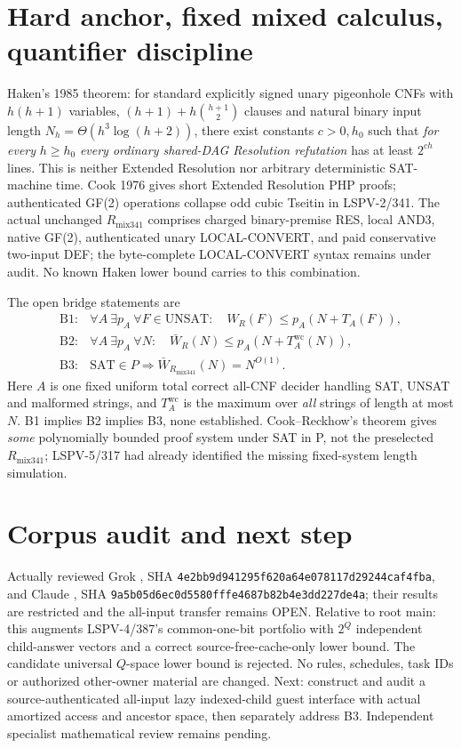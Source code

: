 \documentclass[11pt]{article}
\begin{document}
\section*{Hard anchor, fixed mixed calculus, quantifier discipline}
Haken's 1985 theorem: for standard explicitly signed unary pigeonhole CNFs with $h(h+1)$ variables, $(h+1)+h\binom{h+1}2$ clauses and natural binary input length $N_h=\Theta(h^3\log(h+2))$, there exist constants $c>0,h_0$ such that \emph{for every} $h\ge h_0$ \emph{every ordinary shared-DAG Resolution refutation} has at least $2^{ch}$ lines. This is neither Extended Resolution nor arbitrary deterministic SAT-machine time. Cook 1976 gives short Extended Resolution PHP proofs; authenticated GF(2) operations collapse odd cubic Tseitin in LSPV-2/341. The actual unchanged $R_{\mathrm{mix341}}$ comprises charged binary-premise RES, local AND3, native GF(2), authenticated unary LOCAL-CONVERT, and paid conservative two-input DEF; the byte-complete LOCAL-CONVERT syntax remains under audit. No known Haken lower bound carries to this combination.

The open bridge statements are
\[
\begin{array}{rl}
\mathrm{B1}:&\forall A\ \exists p_A\ \forall F\in\mathrm{UNSAT}:\quad W_R(F)\le p_A(N+T_A(F)),\\
\mathrm{B2}:&\forall A\ \exists p_A\ \forall N:\quad\bar W_R(N)\le p_A(N+T_A^{\mathrm{wc}}(N)),\\
\mathrm{B3}:&\mathrm{SAT}\in P\Longrightarrow\bar W_{R_{\mathrm{mix341}}}(N)=N^{O(1)}.
\end{array}
\]
Here $A$ is one fixed uniform total correct all-CNF decider handling SAT, UNSAT and malformed strings, and $T_A^\mathrm{wc}$ is the maximum over \emph{all} strings of length at most $N$. B1 implies B2 implies B3, none established. Cook--Reckhow's theorem gives \emph{some} polynomially bounded proof system under SAT in P, not the preselected $R_{\mathrm{mix341}}$; LSPV-5/317 had already identified the missing fixed-system length simulation.

\section*{Corpus audit and next step}
Actually reviewed Grok , SHA \texttt{4e2bb9d941295f620a64e078117d29244caf4fba}, and Claude , SHA \texttt{9a5b05d6ec0d5580fffe4687b82b4e3dd227de4a}; their results are restricted and the all-input transfer remains OPEN. Relative to root main: this augments LSPV-4/387's common-one-bit portfolio with $2^Q$ independent child-answer vectors and a correct source-free-cache-only lower bound. The candidate universal $Q$-space lower bound is rejected. No rules, schedules, task IDs or authorized other-owner material are changed. Next: construct and audit a source-authenticated all-input lazy indexed-child guest interface with actual amortized access and ancestor space, then separately address B3. Independent specialist mathematical review remains pending.
\end{document}
